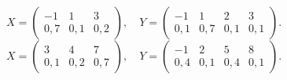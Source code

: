 $$ X = \left(\begin{array}{*{3}{c}} -1 & 1 & 3 \\ 0{,}7 & 0{,}1 & 0{,}2 \end{array}\right), \quad Y = \left(\begin{array}{*{4}{c}} -1 & 1 & 2 & 3 \\ 0{,}1 & 0{,}7 & 0{,}1 & 0{,}1 \end{array}\right). $$
$$ X = \left(\begin{array}{*{3}{c}} 3 & 4 & 7 \\ 0{,}1 & 0{,}2 & 0{,}7 \end{array}\right), \quad Y = \left(\begin{array}{*{4}{c}} -1 & 2 & 5 & 8 \\ 0{,}4 & 0{,}1 & 0{,}4 & 0{,}1 \end{array}\right). $$
